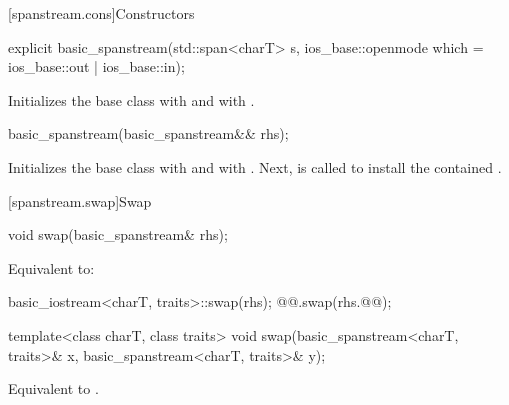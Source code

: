 [spanstream.cons]{Constructors}

%
\begin{itemdecl}
explicit basic_spanstream(std::span<charT> s,
                          ios_base::openmode which = ios_base::out | ios_base::in);
\end{itemdecl}

\begin{itemdescr}
\pnum
\effects
Initializes the base class with
and  with
.
\end{itemdescr}

%
\begin{itemdecl}
basic_spanstream(basic_spanstream&& rhs);
\end{itemdecl}

\begin{itemdescr}
\pnum
\effects
Initializes the base class with 
and  with .
Next, 
is called to install the contained .
\end{itemdescr}

[spanstream.swap]{Swap}

%
\begin{itemdecl}
void swap(basic_spanstream& rhs);
\end{itemdecl}

\begin{itemdescr}
\pnum
\effects
Equivalent to:
\begin{codeblock}
basic_iostream<charT, traits>::swap(rhs);
@@.swap(rhs.@@);
\end{codeblock}
\end{itemdescr}

%
\begin{itemdecl}
template<class charT, class traits>
  void swap(basic_spanstream<charT, traits>& x, basic_spanstream<charT, traits>& y);
\end{itemdecl}

\begin{itemdescr}
\pnum
\effects
Equivalent to .
\end{itemdescr}

